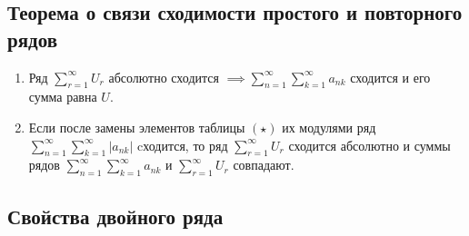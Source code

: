 \newpage

\subsection{Теорема о связи сходимости простого и повторного рядов}

\begin{theorem}\leavevmode
    \begin{enumerate}
        \item Ряд $ \sum_{r=1}^{\infty}U_r $ абсолютно сходится $\implies \sum_{n=1}^{\infty}\sum_{k=1}^{\infty}a_{nk} $ сходится и его сумма равна $U$.

        \item Если после замены элементов таблицы $(\star)$ их модулями ряд \\ $ \sum_{n=1}^{\infty}\sum_{k=1}^{\infty}|a_{nk}| $ cходится, то ряд $ \sum_{r=1}^{\infty}U_r $ сходится абсолютно и суммы рядов $ \sum_{n=1}^{\infty}\sum_{k=1}^{\infty}a_{nk} $ и $ \sum_{r=1}^{\infty}U_r $ совпадают.
    \end{enumerate}
\end{theorem}

\subsection{Свойства двойного ряда}

